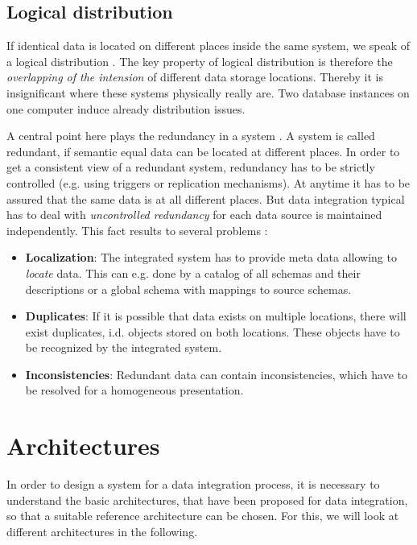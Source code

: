\subsection{Logical distribution}
If identical data is located on different places inside the same system, we speak of a logical distribution \cite[p. 52]{DBLP:books/dp/LeserN2006}. The key property of logical distribution is therefore the \textit{overlapping of the intension} of different data storage locations. Thereby it is insignificant where these systems physically really are. Two database instances on one computer induce already distribution issues.

A central point here plays the redundancy in a system \cite[p. 53]{DBLP:books/dp/LeserN2006}. A system is called redundant, if semantic equal data can be located at different places. In order to get a consistent view of a redundant system, redundancy has to be strictly controlled (e.g. using triggers or replication mechanisms). At anytime it has to be assured that the same data is at all different places. 
But data integration typical has to deal with \textit{uncontrolled redundancy} for each data source is maintained independently. This fact results to several problems \cite[p. 53]{DBLP:books/dp/LeserN2006}:
\begin{itemize}
\item \textbf{Localization}: The integrated system has to provide meta data allowing to \textit{locate} data. This can e.g. done by a catalog of all schemas and their descriptions or a global schema with mappings to source schemas.
\item \textbf{Duplicates}: If it is possible that data exists on multiple locations, there will exist duplicates, i.d. objects stored on both locations. These objects have to be recognized by the integrated system.
\item \textbf{Inconsistencies}: Redundant data can contain inconsistencies, which have to be resolved for a homogeneous presentation.
\end{itemize}

\section{Architectures}

In order to design a system for a data integration process, it is necessary to understand the basic architectures, that have been proposed for data integration, so that a suitable reference architecture can be chosen. For this, we will look at different architectures in the following. 

